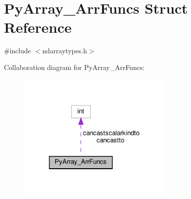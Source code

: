 \hypertarget{structPyArray__ArrFuncs}{}\section{Py\+Array\+\_\+\+Arr\+Funcs Struct Reference}
\label{structPyArray__ArrFuncs}


{\ttfamily \#include $<$ndarraytypes.\+h$>$}



Collaboration diagram for Py\+Array\+\_\+\+Arr\+Funcs\+:
\nopagebreak
\begin{figure}[H]
\begin{center}
\leavevmode
\includegraphics[width=220pt]{structPyArray__ArrFuncs__coll__graph}
\end{center}
\end{figure}
